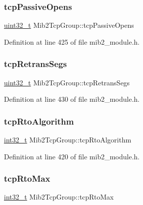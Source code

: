\subsubsection{\texorpdfstring{tcp\+Passive\+Opens}{tcpPassiveOpens}}
{\footnotesize\ttfamily \hyperlink{stdint_8h_a435d1572bf3f880d55459d9805097f62}{uint32\+\_\+t} Mib2\+Tcp\+Group\+::tcp\+Passive\+Opens}



Definition at line 425 of file mib2\+\_\+module.\+h.

\mbox{\label{structMib2TcpGroup_a862d757b0b77851d5d9a2f5bccf2cdb4}} 
\subsubsection{\texorpdfstring{tcp\+Retrans\+Segs}{tcpRetransSegs}}
{\footnotesize\ttfamily \hyperlink{stdint_8h_a435d1572bf3f880d55459d9805097f62}{uint32\+\_\+t} Mib2\+Tcp\+Group\+::tcp\+Retrans\+Segs}



Definition at line 430 of file mib2\+\_\+module.\+h.

\mbox{\label{structMib2TcpGroup_a33717ac6289a0a9b1697810ce19599fa}} 
\subsubsection{\texorpdfstring{tcp\+Rto\+Algorithm}{tcpRtoAlgorithm}}
{\footnotesize\ttfamily \hyperlink{stdint_8h_ab1967d8591af1a4e48c37fd2b0f184d0}{int32\+\_\+t} Mib2\+Tcp\+Group\+::tcp\+Rto\+Algorithm}



Definition at line 420 of file mib2\+\_\+module.\+h.

\mbox{\label{structMib2TcpGroup_a3a2b489e16ac298b666f9ec4f1fe5335}} 
\subsubsection{\texorpdfstring{tcp\+Rto\+Max}{tcpRtoMax}}
{\footnotesize\ttfamily \hyperlink{stdint_8h_ab1967d8591af1a4e48c37fd2b0f184d0}{int32\+\_\+t} Mib2\+Tcp\+Group\+::tcp\+Rto\+Max}



